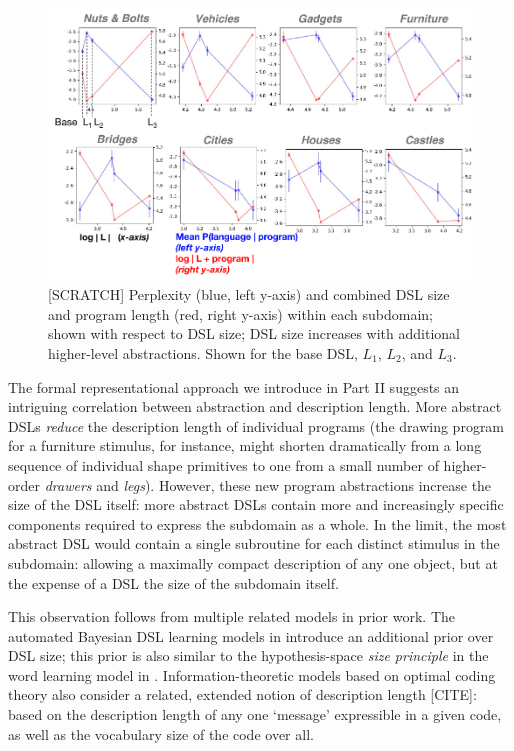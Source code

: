\documentclass[10pt,letterpaper]{article}
\begin{document}
\begin{figure}[h]
  \begin{center}
  \includegraphics[width=\linewidth]{figures/fig_perplexity_costs_narrow.pdf}
  \caption{[SCRATCH] Perplexity (blue, left y-axis) and combined DSL size and program length (red, right y-axis) within each subdomain; shown with respect to DSL size; DSL size increases with additional higher-level abstractions. Shown for the base DSL, $L_1$, $L_2$, and $L_3$.}\label{fig:perplexity-length}
  \end{center}
\end{figure} 

The formal representational approach we introduce in Part II suggests an intriguing correlation between abstraction and description length. More abstract DSLs \textit{reduce} the description length of individual programs (the drawing program for a furniture stimulus, for instance, might shorten dramatically from a long sequence of individual shape primitives to one from a small number of higher-order \textit{drawers} and \textit{legs}). However, these new program abstractions increase the size of the DSL itself: more abstract DSLs contain more and increasingly specific components required to express the subdomain as a whole. In the limit, the most abstract DSL would contain a single subroutine for each distinct stimulus in the subdomain: allowing a maximally compact description of any one object, but at the expense of a DSL the size of the subdomain itself.

This observation follows from multiple related models in prior work. The automated Bayesian DSL learning models in  introduce an additional prior over DSL size; this prior is also similar to the hypothesis-space \textit{size principle} in the word learning model in . Information-theoretic models based on optimal coding theory also consider a related, extended notion of description length [CITE]: based on the description length of any one ‘message’ expressible in a given code, as well as the vocabulary size of the code over all.
\end{document}

